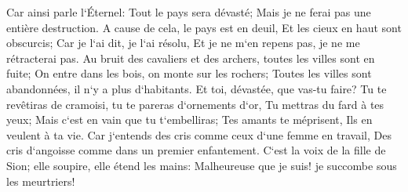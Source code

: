 \verse Car ainsi parle l`Éternel: Tout le pays sera dévasté; Mais je ne ferai pas une entière destruction. 
\verse A cause de cela, le pays est en deuil, Et les cieux en haut sont obscurcis; Car je l`ai dit, je l`ai résolu, Et je ne m`en repens pas, je ne me rétracterai pas. 
\verse Au bruit des cavaliers et des archers, toutes les villes sont en fuite; On entre dans les bois, on monte sur les rochers; Toutes les villes sont abandonnées, il n`y a plus d`habitants. 
\verse Et toi, dévastée, que vas-tu faire? Tu te revêtiras de cramoisi, tu te pareras d`ornements d`or, Tu mettras du fard à tes yeux; Mais c`est en vain que tu t`embelliras; Tes amants te méprisent, Ils en veulent à ta vie. 
\verse Car j`entends des cris comme ceux d`une femme en travail, Des cris d`angoisse comme dans un premier enfantement. C`est la voix de la fille de Sion; elle soupire, elle étend les mains: Malheureuse que je suis! je succombe sous les meurtriers! 

